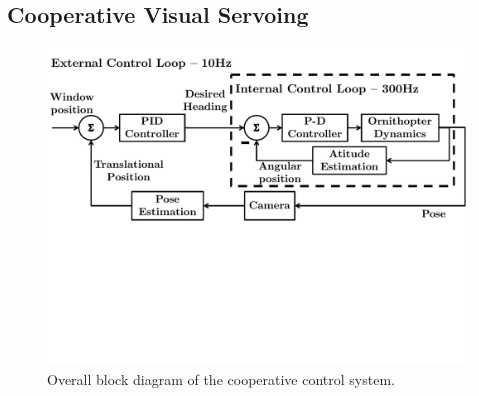 \documentclass{aamas2013}
\begin{document}
\subsection{Cooperative Visual Servoing}
\label{sec:visual_servoing_concept}

\begin{figure}[tb]
\centering
\includegraphics[width=\linewidth]{figures/block_diagrams.pdf}
\caption{Overall block diagram of the cooperative control system.}
\label{fig:block_diagram}
\end{figure}
\end{document}
